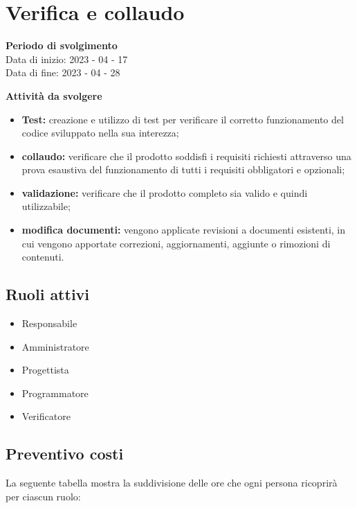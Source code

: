 \section{Verifica e collaudo}

\textbf{Periodo di svolgimento}
\\ Data di inizio: 2023 - 04 - 17 \\ Data di fine: 2023 - 04 - 28

\textbf{Attività da svolgere}
    \begin{itemize}
        \item \textbf{Test:} creazione e utilizzo di test per verificare il corretto funzionamento del codice sviluppato nella sua interezza; 
        \item \textbf{collaudo:} verificare che il prodotto soddisfi i requisiti richiesti attraverso una prova esaustiva del funzionamento di tutti i requisiti obbligatori e opzionali;
        \item \textbf{validazione:} verificare che il prodotto completo sia valido e quindi utilizzabile;
        \item \textbf{modifica documenti:} vengono applicate revisioni a documenti esistenti, in cui vengono apportate correzioni, aggiornamenti, aggiunte o rimozioni di contenuti.
    \end{itemize}

\subsection{Ruoli attivi}
\begin{itemize}
    \item Responsabile 
    \item Amministratore 
    \item Progettista 
    \item Programmatore 
    \item Verificatore 
\end{itemize}

\subsection{Preventivo costi}

La seguente tabella mostra la suddivisione delle ore che ogni persona ricoprirà per ciascun ruolo:

